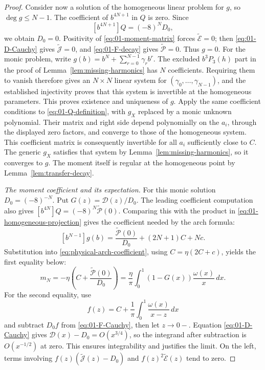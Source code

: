 \begin{proof}
Consider now a solution of the homogeneous linear problem for $g$,
so $\deg g\le N-1$. The coefficient of $b^{4N+1}$ in $Q$ is zero.
Since
\[
 [b^{4N+1}]Q=(-8)^N D_0,
\]
we obtain $D_0=0$. Positivity of \eqref{eq:01-moment-matrix} forces
$\widetilde{\mathcal E}=0$; then
\eqref{eq:01-D-Cauchy} gives $\widetilde{\mathcal J}=0$, and
\eqref{eq:01-F-decay} gives $\widetilde{\mathcal P}=0$. Thus $g=0$.
For the monic problem, write $g(b)=b^N+\sum_{r=0}^{N-1}\gamma_r b^r$.
The excluded $b^3P_3(h)$ part in the proof of
Lemma~\ref{lem:missing-harmonics} has $N$ coefficients. Requiring them
to vanish therefore gives an $N\times N$ linear system for
$(\gamma_0,\ldots,\gamma_{N-1})$, and the established injectivity
proves that this system is invertible at the homogeneous parameters.
This proves existence and uniqueness of $g$.
Apply the same coefficient conditions to \eqref{eq:01-Q-definition},
with $g_X$ replaced by a monic unknown polynomial. Their matrix and right side depend
polynomially on the $a_i$, through the displayed zero factors, and
converge to those of the homogeneous system. This coefficient matrix
is consequently invertible for all $a_i$ sufficiently close to $C$.
The generic $g_X$ satisfies that system by
Lemma~\ref{lem:missing-harmonics}, so it converges to $g$.
The moment itself is regular at the homogeneous point by
Lemma~\ref{lem:transfer-decay}.

\smallskip\noindent\emph{The moment coefficient and its expectation.}
For this monic solution $D_0=(-8)^{-N}$. Put
$G(z)=\mathcal D(z)/D_0$.
The leading coefficient computation also gives
$[b^{4N}]Q=(-8)^N\widetilde{\mathcal P}(0)$. Comparing this with the
product in \eqref{eq:01-homogeneous-projection} gives the coefficient
needed by the arch formula:
\[
 [b^{N-1}]g(b)=\frac{\widetilde{\mathcal P}(0)}{D_0}
                    +(2N+1)C+Nc.
\]
Substitution into \eqref{eq:physical-arch-coefficient}, using
$C=\eta(2C+c)$, yields the first equality below:
\begin{equation}\label{eq:01-moment-D}
 m_N=-\eta\left(C+\frac{\widetilde{\mathcal P}(0)}{D_0}\right)
     =\frac\eta\pi\int_0^1(1-G(x))\frac{\omega(x)}x\,dx.
\end{equation}
For the second equality, use
\[
 f(z)=C+\frac1\pi\int_0^1\frac{\omega(x)}{x-z}\,dx
\]
and subtract $D_0f$ from \eqref{eq:01-F-Cauchy}, then let $z\to0-$.
Equation \eqref{eq:01-D-Cauchy} gives
$\mathcal D(x)-D_0=O(x^{3/4})$, so the integrand after subtraction is $O(x^{-1/2})$ at zero.
This ensures integrability and justifies the limit. On the left, terms involving
$f(z)(\widetilde{\mathcal J}(z)-D_0)$ and
$f(z)^2\widetilde{\mathcal E}(z)$ tend to zero.


\end{proof}
